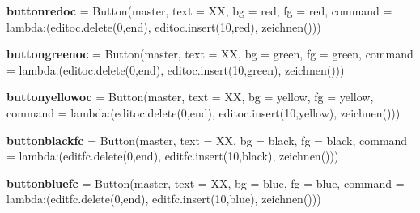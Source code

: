 \begin{DoxyCompactItemize}
\item 
\mbox{\label{namespacelatest_a214ea3fdfcd8d53b1697a2a91b5907d8}} 
{\bfseries buttonredoc} = Button(master, text = \textquotesingle{}XX\textquotesingle{}, bg = \textquotesingle{}red\textquotesingle{}, fg = \textquotesingle{}red\textquotesingle{}, command = lambda\+:(editoc.\+delete(0,\textquotesingle{}end\textquotesingle{}), editoc.\+insert(10,\textquotesingle{}red\textquotesingle{}), zeichnen()))
\item 
\mbox{\label{namespacelatest_a7614b2fbbea0e2f72fd9b976cd6929b8}} 
{\bfseries buttongreenoc} = Button(master, text = \textquotesingle{}XX\textquotesingle{}, bg = \textquotesingle{}green\textquotesingle{}, fg = \textquotesingle{}green\textquotesingle{}, command = lambda\+:(editoc.\+delete(0,\textquotesingle{}end\textquotesingle{}), editoc.\+insert(10,\textquotesingle{}green\textquotesingle{}), zeichnen()))
\item 
\mbox{\label{namespacelatest_a9edd46c835906c43f27083296184c64c}} 
{\bfseries buttonyellowoc} = Button(master, text = \textquotesingle{}XX\textquotesingle{}, bg = \textquotesingle{}yellow\textquotesingle{}, fg = \textquotesingle{}yellow\textquotesingle{}, command = lambda\+:(editoc.\+delete(0,\textquotesingle{}end\textquotesingle{}), editoc.\+insert(10,\textquotesingle{}yellow\textquotesingle{}), zeichnen()))
\item 
\mbox{\label{namespacelatest_ad4ad4232c92c393c542fd184d245340c}} 
{\bfseries buttonblackfc} = Button(master, text = \textquotesingle{}XX\textquotesingle{}, bg = \textquotesingle{}black\textquotesingle{}, fg = \textquotesingle{}black\textquotesingle{}, command = lambda\+:(editfc.\+delete(0,\textquotesingle{}end\textquotesingle{}), editfc.\+insert(10,\textquotesingle{}black\textquotesingle{}), zeichnen()))
\item 
\mbox{\label{namespacelatest_ae538ba56e407cc801b6dc7b792b8627e}} 
{\bfseries buttonbluefc} = Button(master, text = \textquotesingle{}XX\textquotesingle{}, bg = \textquotesingle{}blue\textquotesingle{}, fg = \textquotesingle{}blue\textquotesingle{}, command = lambda\+:(editfc.\+delete(0,\textquotesingle{}end\textquotesingle{}), editfc.\+insert(10,\textquotesingle{}blue\textquotesingle{}), zeichnen()))
\item 

\end{DoxyCompactItemize}
